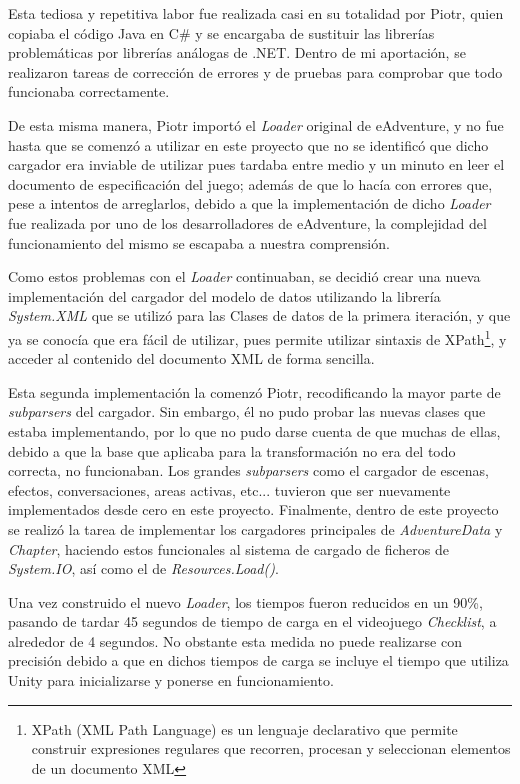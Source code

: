 Esta tediosa y repetitiva labor fue realizada casi en su totalidad por Piotr, quien copiaba el código Java en C\# y se encargaba de sustituir las librerías problemáticas por librerías análogas de .NET. Dentro de mi aportación, se realizaron tareas de corrección de errores y de pruebas para comprobar que todo funcionaba correctamente.

De esta misma manera, Piotr importó el \textit{Loader} original de eAdventure, y no fue hasta que se comenzó a utilizar en este proyecto que no se identificó que dicho cargador era inviable de utilizar pues tardaba entre medio y un minuto en leer el documento de especificación del juego; además de que lo hacía con errores que, pese a intentos de arreglarlos, debido a que la implementación de dicho \textit{Loader} fue realizada por uno de los desarrolladores de eAdventure, la complejidad del funcionamiento del mismo se escapaba a nuestra comprensión.

Como estos problemas con el \textit{Loader} continuaban, se decidió crear una nueva implementación del cargador del modelo de datos utilizando la librería \textit{System.XML} que se utilizó para las Clases de datos de la primera iteración, y que ya se conocía que era fácil de utilizar, pues permite utilizar sintaxis de XPath\footnote{XPath (XML Path Language) es un lenguaje declarativo que permite construir expresiones regulares que recorren, procesan y seleccionan elementos de un documento XML}, y acceder al contenido del documento XML de forma sencilla.

Esta segunda implementación la comenzó Piotr, recodificando la mayor parte de \textit{subparsers} del cargador. Sin embargo, él no pudo probar las nuevas clases que estaba implementando, por lo que no pudo darse cuenta de que muchas de ellas, debido a que la base que aplicaba para la transformación no era del todo correcta, no funcionaban. Los grandes \textit{subparsers} como el cargador de escenas, efectos, conversaciones, areas activas, etc... tuvieron que ser nuevamente implementados desde cero en este proyecto. Finalmente, dentro de este proyecto se realizó la tarea de implementar los cargadores principales de \textit{AdventureData} y \textit{Chapter}, haciendo estos funcionales al sistema de cargado de ficheros de \textit{System.IO}, así como el de \textit{Resources.Load()}.

Una vez construido el nuevo \textit{Loader}, los tiempos fueron reducidos en un 90\%, pasando de tardar 45 segundos de tiempo de carga en el videojuego \textit{Checklist}, a alrededor de 4 segundos. No obstante esta medida no puede realizarse con precisión debido a que en dichos tiempos de carga se incluye el tiempo que utiliza Unity para inicializarse y ponerse en funcionamiento.

